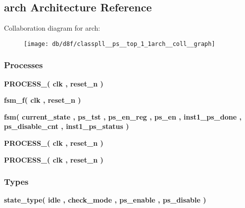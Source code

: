 \subsection{arch Architecture Reference}
\label{classpll__ps__top_1_1arch}


Collaboration diagram for arch\+:\nopagebreak
\begin{figure}[H]
\begin{center}
\leavevmode
\texttt{[image: db/d8f/classpll\_\_ps\_\_top\_1\_1arch\_\_coll\_\_graph]}
\end{center}
\end{figure}
\subsubsection*{Processes}
 \begin{DoxyCompactItemize}
\item 
{\bf P\+R\+O\+C\+E\+S\+S\+\_}{\bfseries  ( {\bfseries {\bfseries {\bf clk}} \textcolor{vhdlchar}{ }} , {\bfseries {\bfseries {\bf reset\+\_\+n}} \textcolor{vhdlchar}{ }} )}
\item 
{\bf fsm\+\_\+f}{\bfseries  ( {\bfseries {\bfseries {\bf clk}} \textcolor{vhdlchar}{ }} , {\bfseries {\bfseries {\bf reset\+\_\+n}} \textcolor{vhdlchar}{ }} )}
\item 
{\bf fsm}{\bfseries  ( {\bfseries {\bfseries {\bf current\+\_\+state}} \textcolor{vhdlchar}{ }} , {\bfseries {\bfseries {\bf ps\+\_\+tst}} \textcolor{vhdlchar}{ }} , {\bfseries {\bfseries {\bf ps\+\_\+en\+\_\+reg}} \textcolor{vhdlchar}{ }} , {\bfseries {\bfseries {\bf ps\+\_\+en}} \textcolor{vhdlchar}{ }} , {\bfseries {\bfseries {\bf inst1\+\_\+ps\+\_\+done}} \textcolor{vhdlchar}{ }} , {\bfseries {\bfseries {\bf ps\+\_\+disable\+\_\+cnt}} \textcolor{vhdlchar}{ }} , {\bfseries {\bfseries {\bf inst1\+\_\+ps\+\_\+status}} \textcolor{vhdlchar}{ }} )}
\item 
{\bf P\+R\+O\+C\+E\+S\+S\+\_}{\bfseries  ( {\bfseries {\bfseries {\bf clk}} \textcolor{vhdlchar}{ }} , {\bfseries {\bfseries {\bf reset\+\_\+n}} \textcolor{vhdlchar}{ }} )}
\item 
{\bf P\+R\+O\+C\+E\+S\+S\+\_}{\bfseries  ( {\bfseries {\bfseries {\bf clk}} \textcolor{vhdlchar}{ }} , {\bfseries {\bfseries {\bf reset\+\_\+n}} \textcolor{vhdlchar}{ }} )}
\end{DoxyCompactItemize}
\subsubsection*{Types}
 \begin{DoxyCompactItemize}
\item 
{\bfseries {\bf state\+\_\+type}{\bfseries \textcolor{vhdlchar}{(}\textcolor{vhdlchar}{ }\textcolor{vhdlchar}{idle}\textcolor{vhdlchar}{ }\textcolor{vhdlchar}{,}\textcolor{vhdlchar}{ }\textcolor{vhdlchar}{check\+\_\+mode}\textcolor{vhdlchar}{ }\textcolor{vhdlchar}{,}\textcolor{vhdlchar}{ }\textcolor{vhdlchar}{ps\+\_\+enable}\textcolor{vhdlchar}{ }\textcolor{vhdlchar}{,}\textcolor{vhdlchar}{ }\textcolor{vhdlchar}{ps\+\_\+disable}\textcolor{vhdlchar}{ }\textcolor{vhdlchar}{)}\textcolor{vhdlchar}{ }}} 
\end{DoxyCompactItemize}
